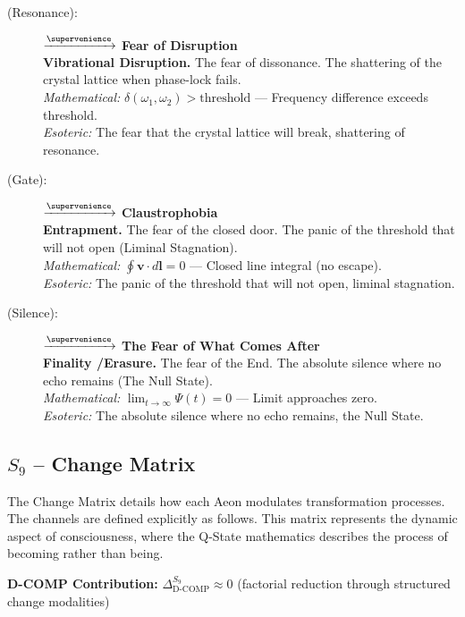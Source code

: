\begin{description}
    \item[(Resonance):] \zheklokh $\xrightarrow{\supervenience}$ \textbf{Fear of Disruption} \\
    \textbf{Vibrational Disruption.} The fear of dissonance. The shattering of the crystal lattice when phase-lock fails. \\
    \textit{Mathematical:} $\delta(\omega_1, \omega_2) > \text{threshold}$ — Frequency difference exceeds threshold. \\
    \textit{Esoteric:} The fear that the crystal lattice will break, shattering of resonance.

    \item[(Gate):] \shavporu $\xrightarrow{\supervenience}$ \textbf{Claustrophobia} \\
    \textbf{Entrapment.} The fear of the closed door. The panic of the threshold that will not open (Liminal Stagnation). \\
    \textit{Mathematical:} $\oint \mathbf{v} \cdot d\mathbf{l} = 0$ — Closed line integral (no escape). \\
    \textit{Esoteric:} The panic of the threshold that will not open, liminal stagnation.

    \item[(Silence):] \trigconti $\xrightarrow{\supervenience}$ \textbf{The Fear of What Comes After} \\
    \textbf{Finality \slash Erasure.} The fear of the End. The absolute silence where no echo remains (The Null State). \\
    \textit{Mathematical:} $\lim_{t\to\infty} \Psi(t) = 0$ — Limit approaches zero. \\
    \textit{Esoteric:} The absolute silence where no echo remains, the Null State.
\end{description}
\subsection{$S_{9}$ -- Change Matrix}\label{sec:19.3}

The Change Matrix details how each Aeon modulates transformation processes. The channels are defined explicitly as follows. This matrix represents the dynamic aspect of consciousness, where the Q-State mathematics describes the process of becoming rather than being.

\textbf{D-COMP Contribution:} $\Delta_{\text{D-COMP}}^{S_9} \approx 0$ (factorial reduction through structured change modalities)

